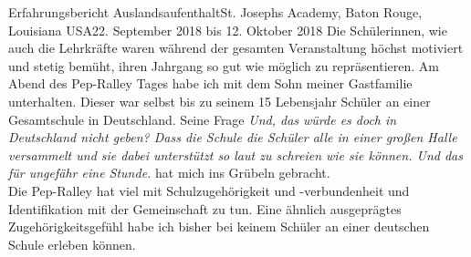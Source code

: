 \documentclass[oneside,openany,headings=optiontotoc,11pt,numbers=noenddot]{article}
\begin{document}
\begin{worksheet}{Erfahrungsbericht Auslandsaufenthalt}{St. Joseph\grq{}s Academy, Baton Rouge, Louisiana USA}{22. September 2018 bis 12. Oktober 2018}
		Die Schülerinnen, wie auch die Lehrkräfte waren während der gesamten Veranstaltung höchst motiviert und stetig bemüht, ihren Jahrgang so gut wie möglich zu repräsentieren.
		\small{Am Abend des Pep-Ralley Tages habe ich mit dem Sohn meiner Gastfamilie unterhalten. Dieser war selbst bis zu seinem 15 Lebensjahr Schüler an einer Gesamtschule in Deutschland. Seine Frage \glqq{}\textit{Und, das würde es doch in Deutschland nicht geben? Dass die Schule die Schüler alle in einer großen Halle versammelt und sie dabei unterstützt so laut zu schreien wie sie können. Und das für ungefähr eine Stunde.}\grqq{} hat mich ins Grübeln gebracht.\\
		Die Pep-Ralley hat viel mit Schulzugehörigkeit und -verbundenheit und Identifikation mit der Gemeinschaft zu tun. Eine ähnlich ausgeprägtes Zugehörigkeitsgefühl habe ich bisher bei keinem Schüler an einer deutschen Schule erleben können.}\\

\end{worksheet}
\end{document}
